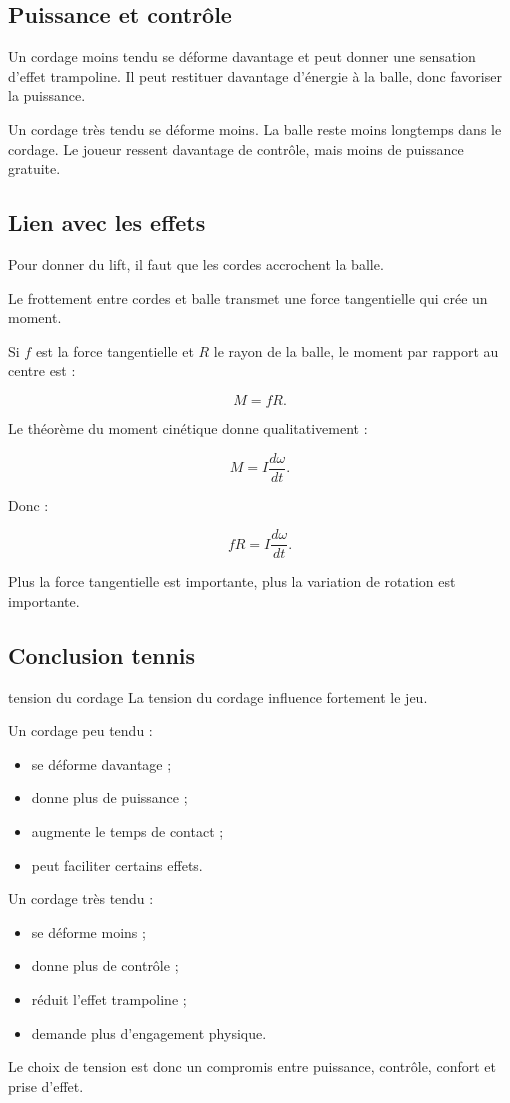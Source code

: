 \documentclass[11pt,a4paper]{article}
\begin{document}
\subsection{Puissance et contrôle}

Un cordage moins tendu se déforme davantage et peut donner une sensation d'effet trampoline.
Il peut restituer davantage d'énergie à la balle, donc favoriser la puissance.

Un cordage très tendu se déforme moins.
La balle reste moins longtemps dans le cordage.
Le joueur ressent davantage de contrôle, mais moins de puissance gratuite.

\subsection{Lien avec les effets}

Pour donner du lift, il faut que les cordes accrochent la balle.

Le frottement entre cordes et balle transmet une force tangentielle qui crée un moment.

Si $f$ est la force tangentielle et $R$ le rayon de la balle, le moment par rapport au centre est :

\[
M=fR.
\]

Le théorème du moment cinétique donne qualitativement :

\[
M=I\frac{d\omega}{dt}.
\]

Donc :

\[
fR=I\frac{d\omega}{dt}.
\]

Plus la force tangentielle est importante, plus la variation de rotation est importante.

\subsection{Conclusion tennis}

\begin{tennis}{tension du cordage}
La tension du cordage influence fortement le jeu.

Un cordage peu tendu :
\begin{itemize}
    \item se déforme davantage ;
    \item donne plus de puissance ;
    \item augmente le temps de contact ;
    \item peut faciliter certains effets.
\end{itemize}

Un cordage très tendu :
\begin{itemize}
    \item se déforme moins ;
    \item donne plus de contrôle ;
    \item réduit l'effet trampoline ;
    \item demande plus d'engagement physique.
\end{itemize}

Le choix de tension est donc un compromis entre puissance, contrôle, confort et prise d'effet.
\end{tennis}
\end{document}
